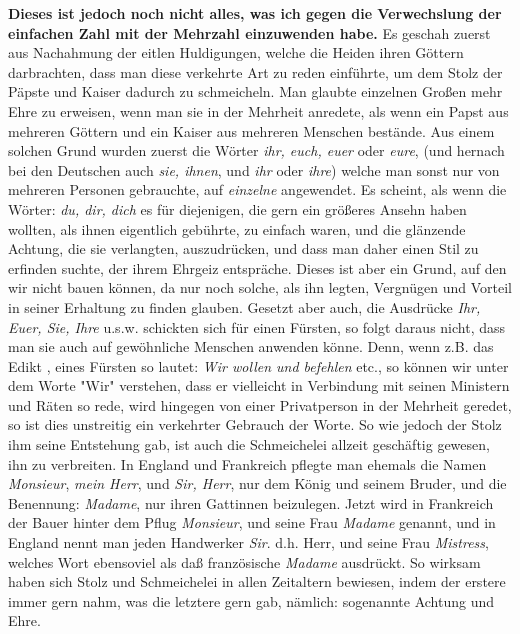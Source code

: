 \textbf{Dieses ist jedoch noch nicht alles, was ich gegen die Verwechslung der
einfachen Zahl mit der Mehrzahl einzuwenden habe.} Es geschah zuerst aus
Nachahmung der eitlen Huldigungen, welche die Heiden
ihren Göttern darbrachten,
dass man diese verkehrte Art zu reden einführte, um dem Stolz der
Päpste und
Kaiser dadurch zu schmeicheln.
Man glaubte einzelnen Großen mehr Ehre zu
erweisen, wenn man sie in der Mehrheit anredete, als wenn ein Papst aus mehreren
Göttern und ein Kaiser aus mehreren Menschen bestände. Aus einem solchen Grund
wurden zuerst die Wörter \textit{ihr, euch, euer} oder \textit{eure}, (und
hernach bei
den Deutschen auch \textit{sie, ihnen}, und \textit{ihr} oder \textit{ihre})
welche man sonst
nur von mehreren Personen gebrauchte, auf \textit{einzelne} angewendet. Es
scheint,
als wenn die Wörter: \textit{du, dir, dich} es für diejenigen, die gern ein
größeres
Ansehn haben wollten, als ihnen eigentlich gebührte, zu einfach waren, und die
glänzende Achtung, die sie verlangten, auszudrücken, und dass man daher einen
Stil zu erfinden suchte, der ihrem Ehrgeiz entspräche. Dieses ist aber ein
Grund, auf den wir nicht bauen können, da nur noch solche, als ihn legten,
Vergnügen und Vorteil in seiner Erhaltung zu finden glauben. Gesetzt aber auch,
die Ausdrücke \textit{Ihr, Euer, Sie, Ihre} u.s.w. schickten sich für einen
Fürsten,
so folgt daraus nicht, dass man sie auch auf gewöhnliche Menschen anwenden könne.
Denn, wenn z.B. das Edikt ,
eines Fürsten so lautet: \textit{Wir wollen und
befehlen}
etc., so können wir unter dem Worte "Wir" verstehen, dass er vielleicht in
Verbindung mit seinen Ministern und Räten so rede, wird hingegen von einer
Privatperson in der Mehrheit geredet, so ist dies unstreitig ein verkehrter
Gebrauch der Worte. So wie jedoch der Stolz ihm seine Entstehung gab, ist auch
die Schmeichelei allzeit geschäftig gewesen, ihn zu verbreiten. In England und
Frankreich pflegte man ehemals die Namen \textit{Monsieur}, \textit{mein
Herr}, und
\textit{Sir, Herr}, nur dem König und seinem Bruder, und die Benennung:
\textit{Madame},
nur ihren Gattinnen beizulegen. Jetzt wird in Frankreich der
Bauer hinter dem
Pflug \textit{Monsieur}, und seine Frau \textit{Madame} genannt, und in England
nennt man
jeden Handwerker \textit{Sir}. d.h. Herr, und seine
Frau \textit{Mistress}, welches Wort
ebensoviel als daß französische \textit{Madame} ausdrückt. So wirksam haben sich
Stolz und
Schmeichelei in allen Zeitaltern bewiesen, indem der erstere immer gern nahm,
was die letztere gern gab, nämlich: sogenannte Achtung und Ehre.

